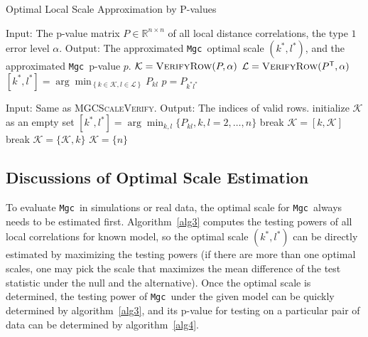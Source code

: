 \documentclass[11pt]{article}
\providecommand{\sct}[1]{{\sc \texttt{#1}}}
\newcommand{\Real}{\mathbb{R}}
\newcommand{\K}{\mathcal{K}}
\newcommand{\LL}{\mathcal{L}}
\newcommand{\T}{^{\ensuremath{\mathsf{T}}}}           %
\newcommand{\Mgc}{\sct{Mgc}}
\begin{document}
\begin{algorithm}
\caption{Optimal Local Scale Approximation by P-values}
\label{alg5}
\begin{algorithmic}[1]
\Statex Input: The p-value matrix $P \in \Real^{n \times n}$ of all local distance correlations, the type $1$ error level $\alpha$.
\Statex Output: The approximated \Mgc~optimal scale $(k^{*},l^{*})$, and the approximated \Mgc~p-value $p$.
\State $\K=\textsc{VerifyRow}(P,\alpha)$ 
\State $\LL=\textsc{VerifyRow}(P\T,\alpha)$ 
\State $[k^{*},l^{*}]=\arg\min_{\left\{k \in \K, l \in \LL\right\}} P_{kl}$ 
\State $p=P_{k^{*}l^{*}}$
\EndFunction
\end{algorithmic}

\begin{algorithmic}[1]
\Statex
\Statex Input: Same as \textsc{MGCScaleVerify}.
\Statex Output: The indices of valid rows.
\State initialize $\K$ as an empty set
\State $[k^{*},l^{*}]=\arg\min_{k, l} \{P_{kl},k,l=2,\ldots,n\}$
 
\State break
\EndIf
\State $\K=[k,\K]$
\EndFor
{} 
\State break
\EndIf
\State $\K=\{\K,k\}$
\EndFor
\If{$\textsc{Median}(P_{kl},k \in \K, l=2,\ldots,n) > \alpha * \frac{|\K|}{n-1}$}
\State $\K=\{n\}$ 
\EndIf
\EndFunction
\end{algorithmic}
\end{algorithm}

\subsection{Discussions of Optimal Scale Estimation}
\label{appen:diss}
To evaluate \Mgc~in simulations or real data, the optimal scale for \Mgc~always needs to be estimated first. Algorithm~\ref{alg3} computes the testing powers of all local correlations for known model, so the optimal scale $(k^{*},l^{*})$ can be directly estimated by maximizing the testing powers (if there are more than one optimal scales, one may pick the scale that maximizes the mean difference of the test statistic under the null and the alternative). Once the optimal scale is determined, the testing power of \Mgc~under the given model can be quickly determined by algorithm~\ref{alg3}, and its p-value for testing on a particular pair of data can be determined by algorithm~\ref{alg4}.
\end{document}
